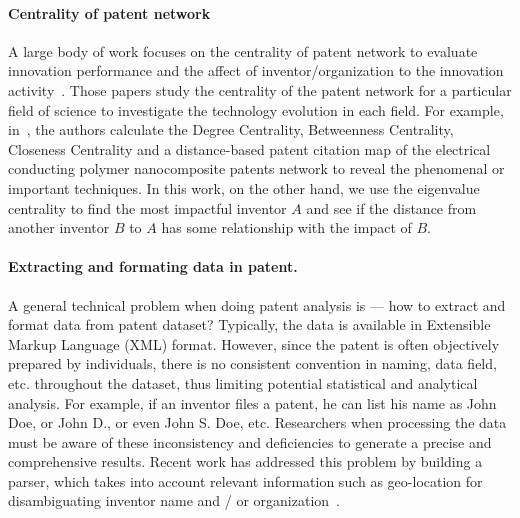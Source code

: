 \paragraph{Centrality of patent network} A large body of work focuses on the centrality 
of patent network to evaluate innovation performance and the affect of inventor/organization to the innovation activity~\cite{Kim2013944, aktamov, Lee2010}. Those papers study the centrality of the patent network for a particular field of science to investigate the technology evolution in each field. For example, in~\cite{Lee2010}, the authors calculate the Degree Centrality, Betweenness Centrality, Closeness Centrality and  a distance-based patent citation map of the electrical conducting polymer nanocomposite patents network to reveal the phenomenal or important techniques. In this work, on the other hand, we use the eigenvalue centrality to find the most impactful inventor $A$ and see if the distance from another inventor $B$ to $A$ has some relationship with the impact of $B$. 

\paragraph{Extracting and formating data in patent.}  A general technical
problem when doing patent analysis is --- how to extract and format data from
patent dataset? Typically, the data is available in Extensible Markup
Language (XML) format. However, since the patent is often objectively prepared
by individuals, there is no consistent convention in naming, data field,
etc. throughout the dataset, thus limiting potential statistical and
analytical analysis. For example, if an inventor files a patent, he can 
list his name as John Doe, or John D., or even John S. Doe, etc. Researchers when
processing the data must be aware of these inconsistency and deficiencies to
generate a precise and comprehensive results. Recent work has addressed this
problem by building a parser, which takes into account relevant information 
such as geo-location for disambiguating inventor name and / or organization~\cite{formattingpatentdata,
disambiguation, Torvik:2009}. 
